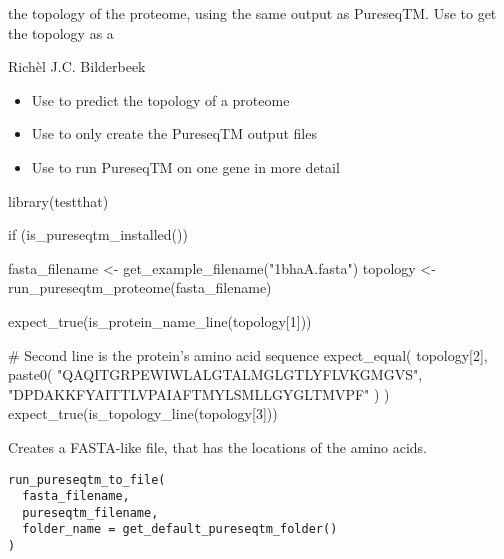 \documentclass[letterpaper]{book}
\begin{document}
%
\begin{Value}
the topology of the proteome, using the same output as PureseqTM.
Use  to get the topology as a
\end{Value}
%
\begin{Author}\relax
Richèl J.C. Bilderbeek
\end{Author}
%
\begin{SeeAlso}\relax
\begin{itemize}

\item{} 
Use  to predict the topology
of a proteome

\item{} 
Use  to only create the PureseqTM
output files

\item{} 
Use  to run PureseqTM on one gene in more detail


\end{itemize}

\end{SeeAlso}
%
\begin{Examples}
\begin{ExampleCode}
library(testthat)

if (is_pureseqtm_installed()) {
  fasta_filename <- get_example_filename("1bhaA.fasta")
  topology <- run_pureseqtm_proteome(fasta_filename)

  expect_true(is_protein_name_line(topology[1]))

  # Second line is the protein's amino acid sequence
  expect_equal(
    topology[2],
    paste0(
      "QAQITGRPEWIWLALGTALMGLGTLYFLVKGMGVS",
      "DPDAKKFYAITTLVPAIAFTMYLSMLLGYGLTMVPF"
    )
  )
  expect_true(is_topology_line(topology[3]))
}
\end{ExampleCode}
\end{Examples}
%
\begin{Description}\relax
Creates a FASTA-like file, that has the locations
of the amino acids.
\end{Description}
%
\begin{Usage}
\begin{verbatim}
run_pureseqtm_to_file(
  fasta_filename,
  pureseqtm_filename,
  folder_name = get_default_pureseqtm_folder()
)
\end{verbatim}
\end{Usage}
\end{document}
